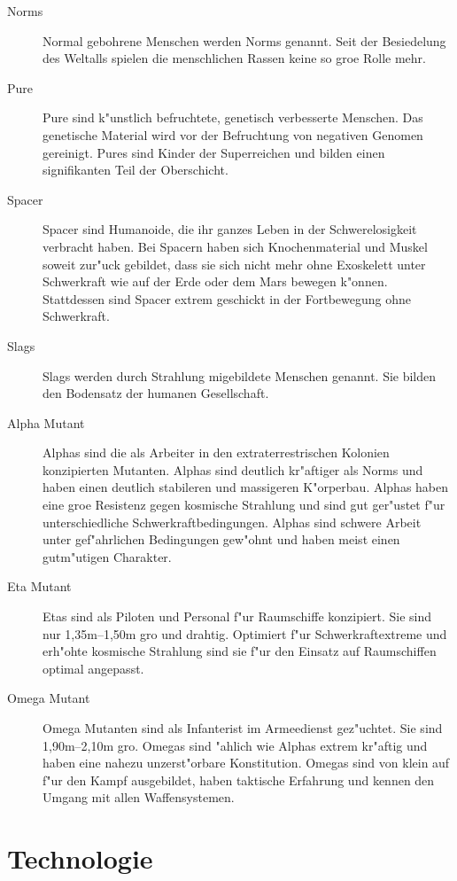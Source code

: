 \begin{description}
\item [Norms] Normal gebohrene Menschen werden Norms genannt. Seit der Besiedelung des Weltalls spielen die
      menschlichen Rassen keine so gro\3e Rolle mehr.
\item [Pure] Pure sind k"unstlich befruchtete, genetisch verbesserte Menschen. Das genetische Material wird vor der
      Befruchtung von negativen Genomen gereinigt. Pures sind Kinder der Superreichen und bilden einen signifikanten Teil der Oberschicht.
\item [Spacer] Spacer sind Humanoide, die ihr ganzes Leben in der Schwerelosigkeit verbracht haben. Bei Spacern haben
      sich Knochenmaterial und Muskel soweit zur"uck gebildet, dass sie sich nicht mehr ohne Exoskelett unter Schwerkraft wie auf der Erde oder dem Mars bewegen k"onnen. Stattdessen sind Spacer extrem geschickt in der Fortbewegung ohne Schwerkraft.
\item [Slags] Slags werden durch Strahlung mi\3gebildete Menschen genannt. Sie bilden den Bodensatz der
      humanen Gesellschaft.
\item [Alpha Mutant] Alphas sind die als Arbeiter in den extraterrestrischen Kolonien konzipierten Mutanten.
      Alphas sind deutlich kr"aftiger als Norms und haben einen deutlich stabileren und massigeren K"orperbau. Alphas haben eine gro\3e Resistenz gegen kosmische Strahlung und sind gut ger"ustet f"ur unterschiedliche Schwerkraftbedingungen. Alphas sind schwere Arbeit unter gef"ahrlichen Bedingungen gew"ohnt und haben meist einen gutm"utigen Charakter.
\item [Eta Mutant] Etas sind als Piloten und Personal f"ur Raumschiffe konzipiert. Sie sind nur 1,35m--1,50m gro\3
      und drahtig. Optimiert f"ur Schwerkraftextreme und erh"ohte kosmische Strahlung sind sie f"ur den Einsatz auf Raumschiffen optimal angepasst.
\item [Omega Mutant] Omega Mutanten sind als Infanterist im Armeedienst gez"uchtet. Sie sind 1,90m--2,10m gro\3.
      Omegas sind "ahlich wie Alphas extrem kr"aftig und haben eine nahezu unzerst"orbare Konstitution. Omegas sind von klein auf f"ur den Kampf ausgebildet, haben taktische Erfahrung und kennen den Umgang mit allen Waffensystemen.
\end{description}

\section{Technologie}

